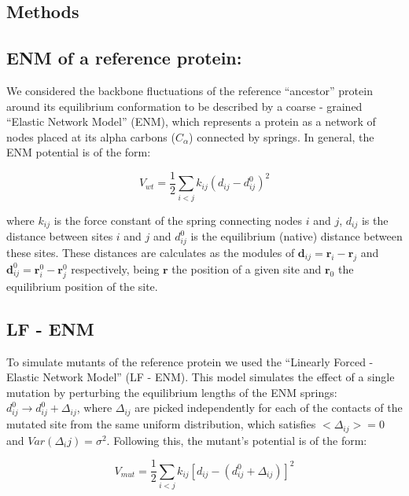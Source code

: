 \documentclass{article}
\begin{document}
\begin{multicols}{2}
\section{Methods}

{\subsection* {ENM of a reference protein:} 

We considered the backbone fluctuations of the reference ``ancestor'' protein around its equilibrium conformation to be described by a coarse - grained ``Elastic Network Model'' (ENM), which represents a protein as a network of nodes placed at its alpha carbons ($C_{\alpha}$) connected by springs. In general, the ENM potential is of the form: 

\begin{equation} \label{eq:Vwt}
V_{wt} = \frac{1}{2} \sum_{i < j} k_{ij} (d_{ij} - d ^ 0_{ij}) ^ 2
\end{equation}

where $k_{ij}$ is the force constant of the spring connecting nodes $i$ and $j$, $d_{ij}$ is the distance between sites $i$ and $j$ and $d ^ 0_{ij}$ is the equilibrium (native) distance between these sites. These distances are calculates as the modules of $\mathbf{d}_{ij} = \mathbf{r}_{i} - \mathbf{r}_{j}$ and  $\mathbf{d} ^ {0}_{ij} = \mathbf{r}^{0}_{i} - \mathbf{r}^{0}_{j}$ respectively, being $\mathbf{r}$ the position of a given site and $\mathbf{r}_{0}$ the equilibrium position of the site. 

{\subsection* {LF - ENM}
To simulate mutants of the reference protein we used the ``Linearly Forced - Elastic Network Model'' (LF - ENM). This model simulates the effect of a single mutation by perturbing the equilibrium lengths of the ENM springs: $d^0_{ij} \to d^0_{ij} + \Delta_{ij}$, where $\Delta_{ij}$ are picked independently for each of the contacts of the mutated site from the same uniform distribution, which satisfies $<\Delta_{ij}> = 0$ and $Var(\Delta_ij) = \sigma^2$. 
Following this, the mutant's potential is of the form:

\begin{equation} \label{eq:Vmut}
V_{mut} = \frac{1}{2} \sum_{i<j} k_{ij} [d_{ij}-(d^0_{ij}+\Delta_{ij})]^2
\end{equation}

}}
\end{multicols}
\end{document}
